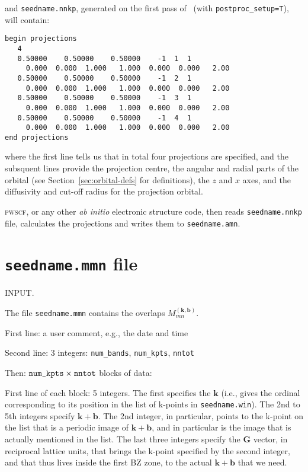 and \verb#seedname.nnkp#, generated on the first pass of
\wannier\ (with \verb#postproc_setup=T#), will contain: 

\begin{verbatim}
begin projections
   4
   0.50000    0.50000    0.50000    -1  1  1
     0.000  0.000  1.000   1.000  0.000  0.000   2.00 
   0.50000    0.50000    0.50000    -1  2  1
     0.000  0.000  1.000   1.000  0.000  0.000   2.00 
   0.50000    0.50000    0.50000    -1  3  1
     0.000  0.000  1.000   1.000  0.000  0.000   2.00 
   0.50000    0.50000    0.50000    -1  4  1
     0.000  0.000  1.000   1.000  0.000  0.000   2.00 
end projections
\end{verbatim}

where the first line tells us that in total four projections are
specified, and the subsquent lines provide the projection centre, the
angular and radial parts of the orbital (see
Section~\ref{sec:orbital-defs} for definitions), the $z$ and $x$ axes,
and the diffusivity and cut-off radius for the projection orbital.

\textsc{pwscf}, or any other \textit{ab initio} electronic structure
code, then reads \verb#seedname.nnkp# file, calculates the projections
and writes them to \verb#seedname.amn#. 


\section{{\tt seedname.mmn} file} 

INPUT. 

The file \verb#seedname.mmn# contains the overlaps
$M_{mn}^{(\mathbf{k,b})}$.

First line: a user comment, e.g., the date and time

Second line: 3 integers: \verb#num_bands#, \verb#num_kpts#,
\verb#nntot#

Then: $\verb#num_kpts#\times\verb#nntot#$ blocks of data:
 
First line of each block: 5 integers. The first specifies the
$\mathbf{k}$ (i.e., gives the ordinal corresponding to its position in
the list  of k-points in \verb#seedname.win#). The 2nd to 5th integers
specify $\mathbf{k+b}$. The  2nd integer, in particular, points to the
k-point on the list that is a  periodic image of $\mathbf{k+b}$, and
in particular is the image that is actually mentioned in the list. The 
last three integers specify the $\mathbf{G}$ vector, in  reciprocal
lattice units, that brings the k-point specified by the second
integer, and that thus lives inside the first BZ zone, to the actual
$\mathbf{k+b}$ that we need.

